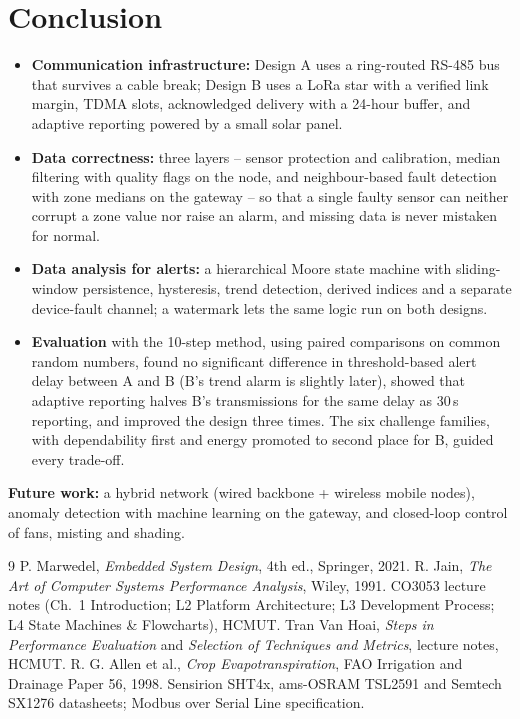 \documentclass[11pt,a4paper]{report}
\begin{document}
\chapter{Conclusion}\label{ch:concl}
\begin{itemize}
  \item \textbf{Communication infrastructure:} Design A uses a ring-routed RS-485 bus that survives a cable break; Design B uses a LoRa star with a verified link margin, TDMA slots, acknowledged delivery with a 24-hour buffer, and adaptive reporting powered by a small solar panel.
  \item \textbf{Data correctness:} three layers -- sensor protection and calibration, median filtering with quality flags on the node, and neighbour-based fault detection with zone medians on the gateway -- so that a single faulty sensor can neither corrupt a zone value nor raise an alarm, and missing data is never mistaken for normal.
  \item \textbf{Data analysis for alerts:} a hierarchical Moore state machine with sliding-window persistence, hysteresis, trend detection, derived indices and a separate device-fault channel; a watermark lets the same logic run on both designs.
  \item \textbf{Evaluation} with the 10-step method, using paired comparisons on common random numbers, found no significant difference in threshold-based alert delay between A and B (B's trend alarm is slightly later), showed that adaptive reporting halves B's transmissions for the same delay as 30\,s reporting, and improved the design three times. The six challenge families, with dependability first and energy promoted to second place for B, guided every trade-off.
\end{itemize}
\textbf{Future work:} a hybrid network (wired backbone + wireless mobile nodes), anomaly detection with machine learning on the gateway, and closed-loop control of fans, misting and shading.

\begin{thebibliography}{9}
 P. Marwedel, \emph{Embedded System Design}, 4th ed., Springer, 2021.
 R. Jain, \emph{The Art of Computer Systems Performance Analysis}, Wiley, 1991.
 CO3053 lecture notes (Ch.~1 Introduction; L2 Platform Architecture; L3 Development Process; L4 State Machines \& Flowcharts), HCMUT.
 Tran Van Hoai, \emph{Steps in Performance Evaluation} and \emph{Selection of Techniques and Metrics}, lecture notes, HCMUT.
 R. G. Allen et al., \emph{Crop Evapotranspiration}, FAO Irrigation and Drainage Paper 56, 1998.
 Sensirion SHT4x, ams-OSRAM TSL2591 and Semtech SX1276 datasheets; Modbus over Serial Line specification.
\end{thebibliography}
\end{document}
